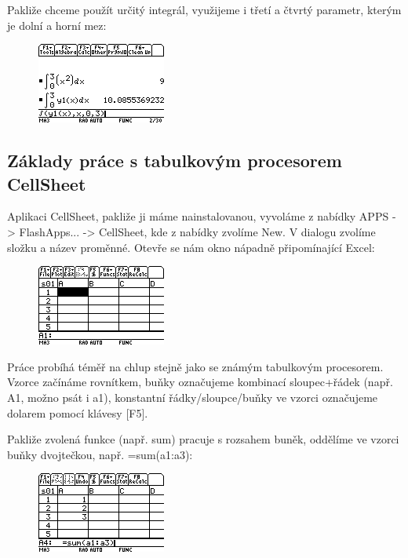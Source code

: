 \documentclass[10pt,a4paper,float]{article}
\begin{document}
Pakliže chceme použít určitý integrál, využijeme i třetí a čtvrtý parametr, kterým je dolní a horní mez:

\begin{figure}[H]
	\centering
	\includegraphics[width=.5\textwidth]{img/INTEGROVANI2}
\end{figure}

\subsection{Základy práce s tabulkovým procesorem CellSheet}
\label{ssec:cellsheet}
Aplikaci CellSheet, pakliže ji máme nainstalovanou, vyvoláme z nabídky APPS -> FlashApps... -> CellSheet, kde z nabídky zvolíme New. V dialogu zvolíme složku a název proměnné. Otevře se nám okno nápadně připomínající Excel:

\begin{figure}[H]
	\centering
	\includegraphics[width=.5\textwidth]{img/CELL1}
\end{figure}

Práce probíhá téměř na chlup stejně jako se známým tabulkovým procesorem. Vzorce začínáme rovnítkem, buňky označujeme kombinací sloupec+řádek (např. A1, možno psát i a1), konstantní řádky/sloupce/buňky ve vzorci označujeme dolarem pomocí klávesy [F5].

\pagebreak

Pakliže zvolená funkce (např. sum) pracuje s rozsahem buněk, oddělíme ve vzorci buňky dvojtečkou, např. =sum(a1:a3):

\begin{figure}[H]
	\centering
	\includegraphics[width=.5\textwidth]{img/CELL2}
\end{figure}
\end{document}
